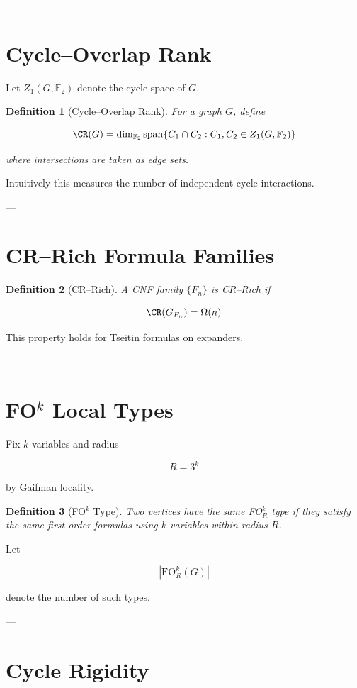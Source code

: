 \documentclass[11pt]{article}
\newtheorem{definition}{Definition}
\begin{document}
---

\section{Cycle–Overlap Rank}

Let $Z_1(G,\mathbb{F}_2)$ denote the cycle space of $G$.

\begin{definition}[Cycle–Overlap Rank]
For a graph $G$, define

\[
\CR(G) =
\dim_{\mathbb{F}_2}
\mathrm{span}\{C_1\cap C_2 :
C_1,C_2 \in Z_1(G,\mathbb{F}_2)\}
\]

where intersections are taken as edge sets.
\end{definition}

Intuitively this measures the number of independent cycle interactions.

---

\section{CR–Rich Formula Families}

\begin{definition}[CR–Rich]
A CNF family $\{F_n\}$ is \emph{CR–Rich} if

\[
\CR(G_{F_n}) = \Omega(n)
\]
\end{definition}

This property holds for Tseitin formulas on expanders.

---

\section{FO$^k$ Local Types}

Fix $k$ variables and radius

\[
R = 3^k
\]

by Gaifman locality.

\begin{definition}[FO$^k$ Type]
Two vertices have the same FO$^k_R$ type if they satisfy the same
first-order formulas using $k$ variables within radius $R$.
\end{definition}

Let

\[
|\mathrm{FO}^k_R(G)|
\]

denote the number of such types.

---

\section{Cycle Rigidity}
\end{document}
